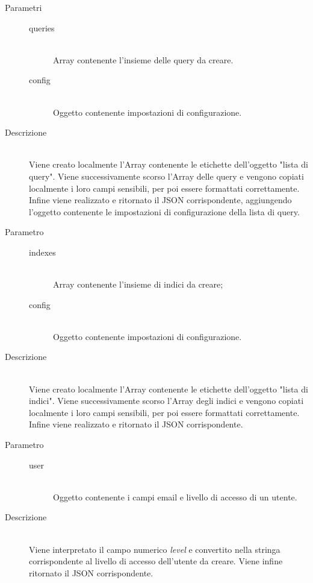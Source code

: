\begin{description}
\begin{mldescription}
    \hfill
   \begin{description}
    \item[Parametri] \hfill
     \begin{description}
      \item[queries] \hfill \\
      Array contenente l'insieme delle query da creare.
      \item[config] \hfill \\
      Oggetto contenente impostazioni di configurazione.
     \end{description}
    \item[Descrizione] \hfill \\
    Viene creato localmente l'Array contenente le etichette dell'oggetto "lista di query". Viene successivamente scorso l'Array delle query e vengono copiati localmente i loro campi sensibili, per poi essere formattati correttamente. Infine viene realizzato e ritornato il JSON corrispondente, aggiungendo l'oggetto contenente le impostazioni di configurazione della lista di query.
   \end{description}
   
    \hfill
   \begin{description}
    \item[Parametro] \hfill
     \begin{description}
      \item[indexes] \hfill \\
      Array contenente l'insieme di indici da creare;
      \item[config] \hfill \\
      Oggetto contenente impostazioni di configurazione.
     \end{description}
    \item[Descrizione] \hfill \\
    Viene creato localmente l'Array contenente le etichette dell'oggetto "lista di indici". Viene successivamente scorso l'Array degli indici e vengono copiati localmente i loro campi sensibili, per poi essere formattati correttamente. Infine viene realizzato e ritornato il JSON corrispondente.
   \end{description}
   
    \hfill
   \begin{description}
    \item[Parametro] \hfill
     \begin{description}
      \item[user] \hfill \\
      Oggetto contenente i campi email e livello di accesso di un utente.
     \end{description}
    \item[Descrizione] \hfill \\
    Viene interpretato il campo numerico \textit{level} e convertito nella stringa corrispondente al livello di accesso dell'utente da creare. Viene infine ritornato il JSON corrispondente.
   \end{description}
   

\end{mldescription}
\end{description}

